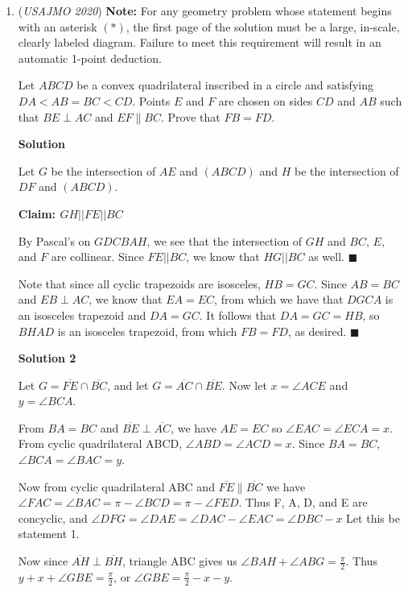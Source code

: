 \begin{enumerate}
	\item (\textit{USAJMO 2020}) \textbf{Note:} For any geometry problem whose statement begins with an asterisk $(*)$, the first page of the solution must be a large, in-scale, clearly labeled diagram. Failure to meet this requirement will result in an automatic 1-point deduction.


 Let $ABCD$ be a convex quadrilateral inscribed in a circle and satisfying $DA < AB = BC < CD$. Points $E$ and $F$ are chosen on sides $CD$ and $AB$ such that $BE \perp AC$ and $EF \parallel BC$. Prove that $FB = FD$.


 



\textbf{Solution}

Let $G$ be the intersection of $AE$ and $(ABCD)$ and $H$ be the intersection of $DF$ and $(ABCD)$.

 \textbf{Claim: $GH || FE || BC$}

 By Pascal's on $GDCBAH$, we see that the intersection of $GH$ and $BC$, $E$, and $F$ are collinear. Since $FE || BC$, we know that $HG || BC$ as well. $\blacksquare$

 Note that since all cyclic trapezoids are isosceles, $HB = GC$. Since $AB = BC$ and $EB \perp AC$, we know that $EA = EC$, from which we have that $DGCA$ is an isosceles trapezoid and $DA = GC$. It follows that $DA = GC = HB$, so $BHAD$ is an isosceles trapezoid, from which $FB = FD$, as desired. $\blacksquare$




\textbf{Solution 2}

Let $G=\overline{FE}\cap\overline{BC}$, and let $G=\overline{AC}\cap\overline{BE}$. Now let $x=\angle ACE$ and $y=\angle BCA$.

 From $BA=BC$ and $\overline{BE}\perp \overline{AC}$, we have $AE=EC$ so $\angle EAC =\angle ECA = x$. From cyclic quadrilateral ABCD, $\angle ABD = \angle ACD = x$. Since $BA=BC$, $\angle BCA = \angle BAC = y$.

 Now from cyclic quadrilateral ABC and $\overline{FE}\parallel \overline{BC}$ we have $\angle FAC = \angle BAC = \pi - \angle BCD = \pi - \angle FED$. Thus F, A, D, and E are concyclic, and $\angle DFG = \angle DAE = \angle DAC - \angle EAC = \angle DBC - x$ Let this be statement 1.

 Now since $\overline{AH}\perp \overline {BH}$, triangle ABC gives us $\angle BAH + \angle ABG = \frac{\pi}{2}$. Thus $y+x+\angle GBE=\frac{\pi}{2}$, or $\angle GBE = \frac{\pi}{2}-x-y$. 


\end{enumerate}
